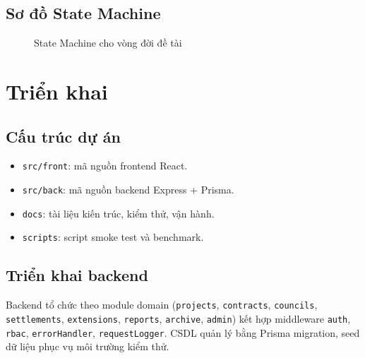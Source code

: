 \documentclass[12pt,a4paper]{report}
\begin{document}
\section{Sơ đồ State Machine}
\begin{figure}[H]
\centering
{}
\caption{State Machine cho vòng đời đề tài}
\end{figure}

\chapter{Triển khai}
\section{Cấu trúc dự án}
\begin{itemize}[leftmargin=1.2cm]
\item \texttt{src/front}: mã nguồn frontend React.
\item \texttt{src/back}: mã nguồn backend Express + Prisma.
\item \texttt{docs}: tài liệu kiến trúc, kiểm thử, vận hành.
\item \texttt{scripts}: script smoke test và benchmark.
\end{itemize}

\section{Triển khai backend}
Backend tổ chức theo module domain (\texttt{projects}, \texttt{contracts}, \texttt{councils}, \texttt{settlements}, \texttt{extensions}, \texttt{reports}, \texttt{archive}, \texttt{admin}) kết hợp middleware \texttt{auth}, \texttt{rbac}, \texttt{errorHandler}, \texttt{requestLogger}. CSDL quản lý bằng Prisma migration, seed dữ liệu phục vụ môi trường kiểm thử.
\end{document}

